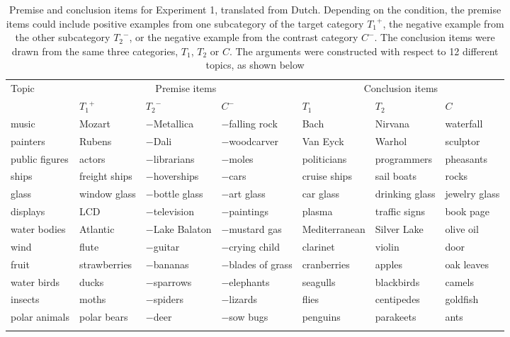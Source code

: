 \documentclass[authoryear,11pt]{elsarticle}
\begin{document}
\begin{table}[p]
\scriptsize
\caption{\small Premise and conclusion items for Experiment 1, translated from Dutch. Depending on the condition, the premise items could include positive examples from one subcategory of the target category ${T_1}^+$, the negative example from the other subcategory ${T_2}^-$, or the negative example from the contrast category $C^-$. The conclusion items were drawn from the same three categories, $T_1$, $T_2$ or $C$. The arguments were constructed with respect to 12 different topics, as shown below\normalsize}
\vspace{-2mm}
\label{table:stimexp1}
\vskip 0.12in
\begin{tabular}{|l|lll|lll|}
\hline
Topic & \multicolumn{3}{c|}{Premise items} & \multicolumn{3}{c|}{Conclusion items}\\
& ${T_1}^+$ &  ${T_2}^-$ & $C^-$ & $T_1$ &  $T_2$ & $C$\\
\hline
music 		&Mozart	    & $-$Metallica		& $-$falling rock	& Bach & Nirvana & waterfall\\
painters	&Rubens			& $-$Dali & $-$woodcarver & Van Eyck & Warhol & sculptor\\
public figures &actors& $-$librarians & $-$moles & politicians & programmers & pheasants\\
ships & freight ships & $-$hoverships & $-$cars & cruise ships & sail boats & rocks\\
glass & window glass	& $-$bottle glass & $-$art glass & car glass & drinking glass & jewelry glass\\
displays &	LCD   	& $-$television	& $-$paintings & plasma  & traffic signs & book page\\
water bodies &Atlantic&  $-$Lake Balaton & $-$mustard gas & Mediterranean & Silver Lake & olive oil\\
wind & flute & $-$guitar & $-$crying child&clarinet&violin& door\\
fruit & strawberries	& $-$bananas & $-$blades of grass & cranberries & apples & oak leaves\\
water birds	& ducks & $-$sparrows & $-$elephants & seagulls & blackbirds & camels\\
insects	& moths 		& $-$spiders & $-$lizards & flies & centipedes & goldfish\\
polar animals & polar bears & $-$deer & $-$sow bugs & penguins & parakeets & ants\\
\hline \multicolumn{7}{c}{ }
\end{tabular}
\end{table}
\end{document}
